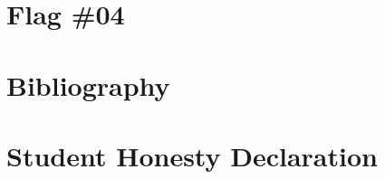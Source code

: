 \section{Flag \#04}


%

\newpage

\section{Bibliography}

\renewcommand{\refname}{\spacedlowsmallcaps{References}} %



%


%


\section{Student Honesty Declaration}





